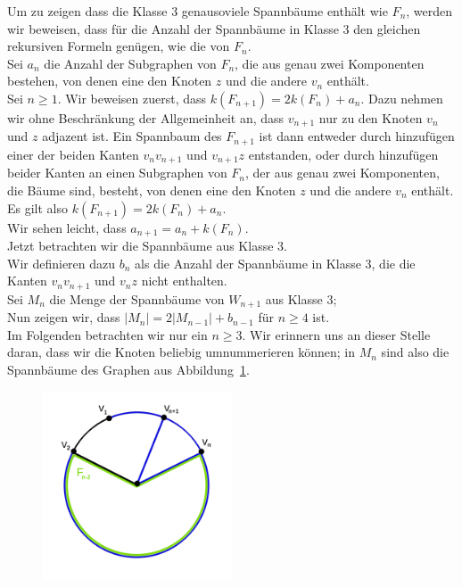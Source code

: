 Um zu zeigen dass die Klasse 3 genausoviele Spannbäume enthält wie $F_n$, werden wir beweisen, dass für die Anzahl der Spannbäume in Klasse 3 den gleichen rekursiven Formeln genügen, wie die von $F_n$.\\
Sei $a_n$ die Anzahl der Subgraphen von $F_n$, die aus genau zwei Komponenten bestehen, von denen eine den Knoten $z$ und die andere $v_n$ enthält.\\
Sei $n \geq 1$.
Wir beweisen zuerst, dass $\mathit{k}\left(F_{n+1}\right)=2\mathit{k}\left(F_{n}\right)+a_n$.
Dazu nehmen wir ohne Beschränkung der Allgemeinheit an, dass $v_{n+1}$ nur zu den Knoten $v_n$ und $z$ adjazent ist. Ein Spannbaum des $F_{n+1}$ ist dann entweder durch hinzufügen einer der beiden Kanten $v_nv_{n+1}$ und $v_{n+1}z$ entstanden, oder durch hinzufügen beider Kanten an einen Subgraphen von $F_n$, der aus genau zwei Komponenten, die Bäume sind, besteht, von denen eine den Knoten $z$ und die andere $v_n$ enthält.\\
Es gilt also $\mathit{k}\left(F_{n+1}\right)=2\mathit{k}\left(F_{n}\right)+a_n$.\\
Wir sehen leicht, dass $a_{n+1}=a_n+\mathit{k}\left(F_n\right)$.\\
Jetzt betrachten wir die Spannbäume aus Klasse 3.\\
Wir definieren dazu $b_n$ als die Anzahl der Spannbäume in Klasse 3, die die Kanten $v_nv_{n+1}$ und $v_{n}z$ nicht enthalten.\\
Sei $M_n$ die Menge der Spannbäume von $W_{n+1}$ aus Klasse 3;\\
Nun zeigen wir, dass $|M_{n}|=2|M_{n-1}|+b_{n-1}$ für $n \geq 4$ ist.\\
Im Folgenden betrachten wir nur ein $n \geq 3$. Wir erinnern uns an dieser Stelle daran, dass wir die Knoten beliebig umnummerieren können; in $M_{n}$ sind also die Spannbäume des Graphen aus Abbildung~\ref{mn1}.
\begin{figure}[H]
  \centering
 \includegraphics[width=0.5\textwidth]{mn1.png}
 \caption{}
 \label{mn1} %
\end{figure}
